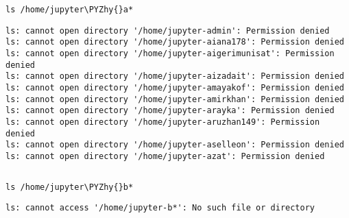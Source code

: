 \documentclass[11pt]{article}
\makeatletter
\def\PYZhy{\char`\-}
\newcommand{\boxspacing}{\kern\kvtcb@left@rule\kern\kvtcb@boxsep}
\newcommand{\prompt}[4]{
        \ttfamily\llap{{\color{#2}[#3]:\hspace{3pt}#4}}\vspace{-\baselineskip}
    }
\makeatother
\begin{document}
    \begin{tcolorbox}[breakable, size=fbox, boxrule=1pt, pad at break*=1mm,colback=cellbackground, colframe=cellborder]
\prompt{In}{incolor}{68}{\boxspacing}
\begin{Verbatim}[commandchars=\\\{\}]
ls /home/jupyter\PYZhy{}a*
\end{Verbatim}
\end{tcolorbox}

    \begin{Verbatim}[commandchars=\\\{\}]
ls: cannot open directory '/home/jupyter-admin': Permission denied
ls: cannot open directory '/home/jupyter-aiana178': Permission denied
ls: cannot open directory '/home/jupyter-aigerimunisat': Permission denied
ls: cannot open directory '/home/jupyter-aizadait': Permission denied
ls: cannot open directory '/home/jupyter-amayakof': Permission denied
ls: cannot open directory '/home/jupyter-amirkhan': Permission denied
ls: cannot open directory '/home/jupyter-arayka': Permission denied
ls: cannot open directory '/home/jupyter-aruzhan149': Permission denied
ls: cannot open directory '/home/jupyter-aselleon': Permission denied
ls: cannot open directory '/home/jupyter-azat': Permission denied
    \end{Verbatim}

    \begin{Verbatim}[commandchars=\\\{\}]

    \end{Verbatim}

    \begin{tcolorbox}[breakable, size=fbox, boxrule=1pt, pad at break*=1mm,colback=cellbackground, colframe=cellborder]
\prompt{In}{incolor}{69}{\boxspacing}
\begin{Verbatim}[commandchars=\\\{\}]
ls /home/jupyter\PYZhy{}b*
\end{Verbatim}
\end{tcolorbox}

    \begin{Verbatim}[commandchars=\\\{\}]
ls: cannot access '/home/jupyter-b*': No such file or directory
    \end{Verbatim}

    \begin{Verbatim}[commandchars=\\\{\}]

    \end{Verbatim}
\end{document}
